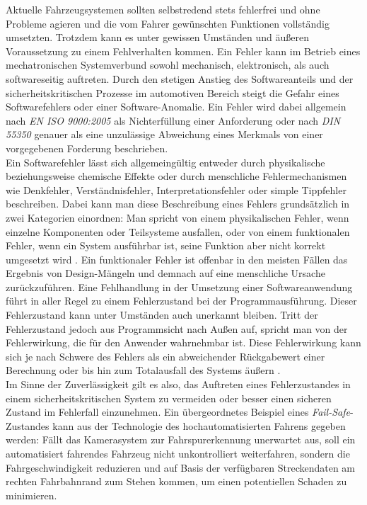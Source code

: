 Aktuelle Fahrzeugsystemen sollten selbstredend stets fehlerfrei und ohne Probleme agieren und die vom Fahrer gewünschten Funktionen vollständig umsetzten. Trotzdem kann es unter gewissen Umständen und äußeren Voraussetzung zu einem Fehlverhalten kommen. Ein Fehler kann im Betrieb eines mechatronischen Systemverbund sowohl mechanisch, elektronisch, als auch softwareseitig auftreten. Durch den stetigen Anstieg des Softwareanteils und der sicherheitskritischen Prozesse im automotiven Bereich steigt die Gefahr eines Softwarefehlers oder einer Software-Anomalie. Ein Fehler wird dabei allgemein nach \emph{EN ISO 9000:2005} \cite{DINDeutschesInstitutfurNormunge.V..201511} als \glqq Nichterfüllung einer Anforderung\grqq{} oder nach \emph{DIN 55350} \cite{DINDeutschesInstitutfurNormunge.V..200805} genauer als \glqq eine unzulässige Abweichung eines Merkmals von einer vorgegebenen Forderung\grqq{} beschrieben. \\
Ein Softwarefehler lässt sich allgemeingültig entweder durch physikalische beziehungsweise chemische Effekte oder durch menschliche Fehlermechanismen wie Denkfehler, Verständnisfehler, Interpretationsfehler oder simple Tippfehler beschreiben. Dabei kann man diese Beschreibung eines Fehlers grundsätzlich in zwei Kategorien einordnen: Man spricht von einem physikalischen Fehler, wenn einzelne Komponenten oder Teilsysteme ausfallen, oder von einem funktionalen Fehler, wenn ein System ausführbar ist, seine Funktion aber nicht korrekt umgesetzt wird \cite{Borcsok.2007}. Ein funktionaler Fehler ist offenbar in den meisten Fällen das Ergebnis von Design-Mängeln und demnach auf eine menschliche Ursache zurückzuführen. Eine Fehlhandlung in der Umsetzung einer Softwareanwendung führt in aller Regel zu einem Fehlerzustand bei der Programmausführung. Dieser Fehlerzustand kann unter Umständen auch unerkannt bleiben. Tritt der Fehlerzustand jedoch aus Programmsicht nach Außen auf, spricht man von der Fehlerwirkung, die für den Anwender wahrnehmbar ist. Diese Fehlerwirkung kann sich je nach Schwere des Fehlers als ein abweichender Rückgabewert einer Berechnung oder bis hin zum Totalausfall des Systems äußern \cite{ISTQBAISBLGermanTestingBoarde.V.2017}. \\
Im Sinne der Zuverlässigkeit gilt es also, das Auftreten eines Fehlerzustandes in einem sicherheitskritischen System zu vermeiden oder besser einen sicheren Zustand im Fehlerfall einzunehmen. Ein übergeordnetes Beispiel eines \emph{Fail-Safe}-Zustandes kann aus der Technologie des hochautomatisierten Fahrens gegeben werden: Fällt das Kamerasystem zur Fahrspurerkennung unerwartet aus, soll ein automatisiert fahrendes Fahrzeug nicht unkontrolliert weiterfahren, sondern die Fahrgeschwindigkeit reduzieren und auf Basis der verfügbaren Streckendaten am rechten Fahrbahnrand zum Stehen kommen, um einen potentiellen Schaden zu minimieren.
 
